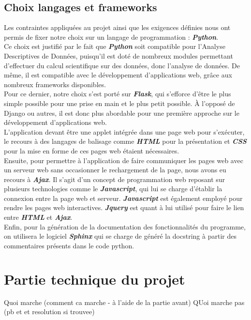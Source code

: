 			
		\subsection{Choix langages et frameworks}
			Les contraintes appliquées au projet ainsi que les exigences définies nous ont permis de fixer notre choix sur un langage de programmation : \textbf{\textit{Python}}.\\
			Ce choix est justifié par le fait que \textbf{\textit{Python}} soit compatible pour l'Analyse Descriptives de Données, puisqu'il est doté de nombreux modules permettant d'effectuer du calcul scientifique sur des données, donc l'analyse de données. De même, il est compatible avec le développement d'applications web, grâce aux nombreux frameworks disponibles.\\
			 Pour ce dernier, notre choix s'est porté sur \textbf{\textit{Flask}}, qui s’efforce d’être le plus simple possible pour une prise en main et le plus petit possible. À l'opposé de Django ou autres, il est donc plus abordable pour une première approche sur le développement d'applications web.\\
			
			L'application devant être une applet intégrée dans une page web pour s'exécuter, le recours à des langages de balisage comme \textbf{\textit{HTML}} pour la présentation et \textbf{\textit{CSS}} pour la mise en forme de ces pages web étaient nécessaires.\\
			
			Ensuite, pour permettre à l'application de faire communiquer les pages web avec un serveur web sans occasionner le rechargement de la page, nous avons eu recours à \textbf{\textit{Ajax}}. Il s'agit d'un concept de programmation web reposant sur plusieurs technologies comme le \textbf{\textit{Javascript}}, qui lui se charge d'établir la connexion entre la page web et serveur. \textbf{\textit{Javascript}} est également employé pour rendre les pages web interactives. \textbf{\textit{Jquery}} est quant à lui utilisé pour faire le lien entre \textbf{\textit{HTML}} et \textbf{\textit{Ajax}}.\\
			
			Enfin, pour la génération de la documentation des fonctionnalités du programme, on utilisera le logiciel \textbf{\textit{Sphinx}} qui se charge de généré la docstring à partir des commentaires présents dans le code python.\\
		
	\section{Partie technique du projet}
		Quoi marche (comment ca marche - à l'aide de la partie avant)
		QUoi marche pas (pb et et resolution si trouvee)
		
